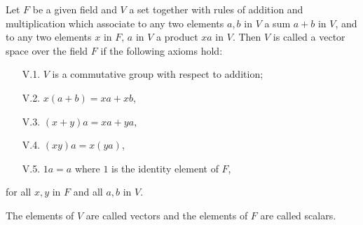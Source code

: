 Let $F$ be a given field and $V$ a set together with rules of addition and multiplication which associate to any two elements $a, b$ in $V$ a sum $a+b$ in $V$, and to any two elements $x$ in $F$, $a$ in $V$ a product $xa$ in $V$. Then $V$ is called a vector space over the field $F$ if the following axioms hold:

\begin{itemize}
\item[V.1.] $V$ is a commutative group with respect to addition;
\item[V.2.] $x(a+b) = xa+xb$,
\item[V.3.] $(x+y)a = xa+ya$,
\item[V.4.] $(xy)a = x(ya)$,
\item[V.5.] $1a=a$ where $1$ is the identity element of $F$,
\end{itemize}

for all $x, y$ in $F$ and all $a, b$ in $V$.

The elements of $V$ are called vectors and the elements of $F$ are called scalars.
